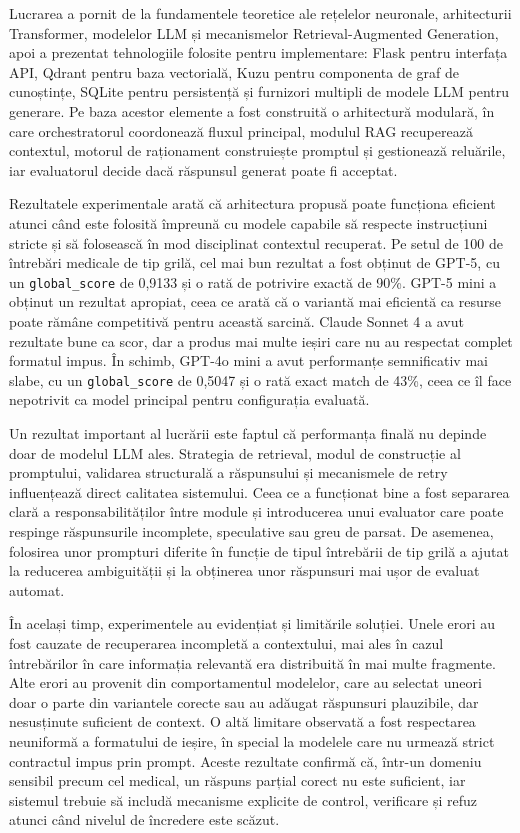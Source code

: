 \documentclass[12pt, a4paper, oneside, romanian]{teza-upb}
\begin{document}
Lucrarea a pornit de la fundamentele teoretice ale rețelelor neuronale, arhitecturii Transformer, modelelor LLM și mecanismelor Retrieval-Augmented Generation, apoi a prezentat tehnologiile folosite pentru implementare: Flask pentru interfața API, Qdrant pentru baza vectorială, Kuzu pentru componenta de graf de cunoștințe, SQLite pentru persistență și furnizori multipli de modele LLM pentru generare. Pe baza acestor elemente a fost construită o arhitectură modulară, în care orchestratorul coordonează fluxul principal, modulul RAG recuperează contextul, motorul de raționament construiește promptul și gestionează reluările, iar evaluatorul decide dacă răspunsul generat poate fi acceptat.

Rezultatele experimentale arată că arhitectura propusă poate funcționa eficient atunci când este folosită împreună cu modele capabile să respecte instrucțiuni stricte și să folosească în mod disciplinat contextul recuperat. Pe setul de 100 de întrebări medicale de tip grilă, cel mai bun rezultat a fost obținut de GPT-5, cu un \texttt{global\_score} de 0,9133 și o rată de potrivire exactă de 90\%. GPT-5 mini a obținut un rezultat apropiat, ceea ce arată că o variantă mai eficientă ca resurse poate rămâne competitivă pentru această sarcină. Claude Sonnet 4 a avut rezultate bune ca scor, dar a produs mai multe ieșiri care nu au respectat complet formatul impus. În schimb, GPT-4o mini a avut performanțe semnificativ mai slabe, cu un \texttt{global\_score} de 0,5047 și o rată exact match de 43\%, ceea ce îl face nepotrivit ca model principal pentru configurația evaluată.

Un rezultat important al lucrării este faptul că performanța finală nu depinde doar de modelul LLM ales. Strategia de retrieval, modul de construcție al promptului, validarea structurală a răspunsului și mecanismele de retry influențează direct calitatea sistemului. Ceea ce a funcționat bine a fost separarea clară a responsabilităților între module și introducerea unui evaluator care poate respinge răspunsurile incomplete, speculative sau greu de parsat. De asemenea, folosirea unor prompturi diferite în funcție de tipul întrebării de tip grilă a ajutat la reducerea ambiguității și la obținerea unor răspunsuri mai ușor de evaluat automat.

În același timp, experimentele au evidențiat și limitările soluției. Unele erori au fost cauzate de recuperarea incompletă a contextului, mai ales în cazul întrebărilor în care informația relevantă era distribuită în mai multe fragmente. Alte erori au provenit din comportamentul modelelor, care au selectat uneori doar o parte din variantele corecte sau au adăugat răspunsuri plauzibile, dar nesusținute suficient de context. O altă limitare observată a fost respectarea neuniformă a formatului de ieșire, în special la modelele care nu urmează strict contractul impus prin prompt. Aceste rezultate confirmă că, într-un domeniu sensibil precum cel medical, un răspuns parțial corect nu este suficient, iar sistemul trebuie să includă mecanisme explicite de control, verificare și refuz atunci când nivelul de încredere este scăzut.
\end{document}
